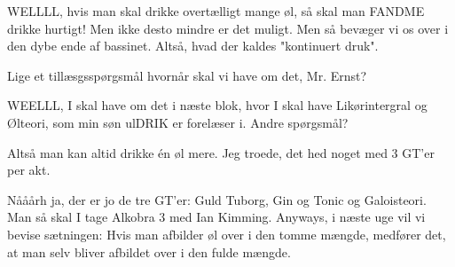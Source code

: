 \documentclass{article}
\begin{document}
\begin{sketch}
     WELLLL, hvis man skal drikke overtælligt mange øl, så skal man FANDME drikke hurtigt! Men ikke desto mindre er det muligt. Men så bevæger vi os over i den dybe ende af bassinet. Altså, hvad der kaldes "kontinuert druk".

     Lige et tillæsgsspørgsmål hvornår skal vi have om det, Mr. Ernst?

     WEELLL, I skal have om det i næste blok, hvor I skal have Likørintergral og Ølteori, som min søn ulDRIK er forelæser i. Andre spørgsmål?
    
      Altså man kan altid drikke én øl mere. Jeg troede, det hed noget med 3 GT'er per akt.
    
     Nååårh ja, der er jo de tre GT'er: Guld Tuborg, Gin og Tonic og Galoisteori. Man så skal I tage Alkobra 3 med Ian Kimming. Anyways, i næste uge vil vi bevise sætningen: Hvis man afbilder øl over i den tomme mængde, medfører det, at man selv bliver afbildet over i den fulde mængde.
\end{sketch} 
\end{document}
